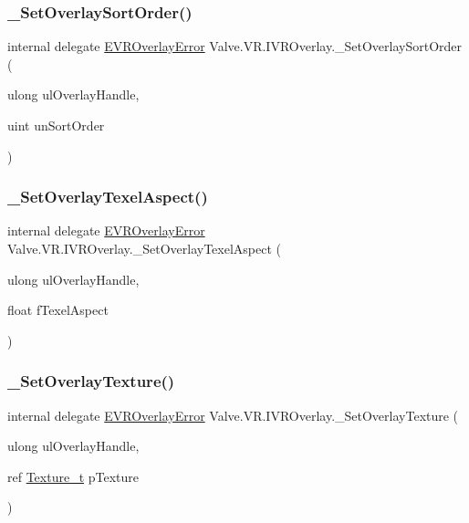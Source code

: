 \subsubsection{\texorpdfstring{\_SetOverlaySortOrder()}{\_SetOverlaySortOrder()}}
{\footnotesize\ttfamily internal delegate \mbox{\hyperlink{namespace_valve_1_1_v_r_aaee5c5144f42b7969d45b854f51b0c18}{E\+V\+R\+Overlay\+Error}} Valve.\+V\+R.\+I\+V\+R\+Overlay.\+\_\+\+Set\+Overlay\+Sort\+Order (\begin{DoxyParamCaption}\item[{ulong}]{ul\+Overlay\+Handle,  }\item[{uint}]{un\+Sort\+Order }\end{DoxyParamCaption})}

\mbox{\label{struct_valve_1_1_v_r_1_1_i_v_r_overlay_a479ce5b1183e93ec53ddbaa1bd62f264}} 
\subsubsection{\texorpdfstring{\_SetOverlayTexelAspect()}{\_SetOverlayTexelAspect()}}
{\footnotesize\ttfamily internal delegate \mbox{\hyperlink{namespace_valve_1_1_v_r_aaee5c5144f42b7969d45b854f51b0c18}{E\+V\+R\+Overlay\+Error}} Valve.\+V\+R.\+I\+V\+R\+Overlay.\+\_\+\+Set\+Overlay\+Texel\+Aspect (\begin{DoxyParamCaption}\item[{ulong}]{ul\+Overlay\+Handle,  }\item[{float}]{f\+Texel\+Aspect }\end{DoxyParamCaption})}

\mbox{\label{struct_valve_1_1_v_r_1_1_i_v_r_overlay_a213cd2c6bbe053b4e8359ca63a2d4089}} 
\subsubsection{\texorpdfstring{\_SetOverlayTexture()}{\_SetOverlayTexture()}}
{\footnotesize\ttfamily internal delegate \mbox{\hyperlink{namespace_valve_1_1_v_r_aaee5c5144f42b7969d45b854f51b0c18}{E\+V\+R\+Overlay\+Error}} Valve.\+V\+R.\+I\+V\+R\+Overlay.\+\_\+\+Set\+Overlay\+Texture (\begin{DoxyParamCaption}\item[{ulong}]{ul\+Overlay\+Handle,  }\item[{ref \mbox{\hyperlink{struct_valve_1_1_v_r_1_1_texture__t}{Texture\+\_\+t}}}]{p\+Texture }\end{DoxyParamCaption})}

